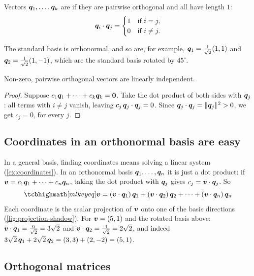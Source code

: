 \begin{definition}\label{def:orthonormal}
Vectors $\bm{q}_1, \dots, \bm{q}_k$ are  if they are pairwise
orthogonal and all have length $1$:
\[
  \bm{q}_i\cdot\bm{q}_j = \begin{cases} 1 & \text{if } i = j,\\
  0 & \text{if } i \neq j. \end{cases}
\]
\end{definition}

The standard basis is orthonormal, and so are, for example,
$\bm{q}_1 = \frac{1}{\sqrt2}(1, 1)$ and $\bm{q}_2 = \frac{1}{\sqrt2}(1, -1)$, which
are the standard basis rotated by $45^\circ$.

\begin{proposition}\label{prop:orth-indep}
Non-zero, pairwise orthogonal vectors are linearly independent.
\end{proposition}

\begin{proof}
Suppose $c_1\bm{q}_1 + \dots + c_k\bm{q}_k = \bm{0}$. Take the dot product of both
sides with $\bm{q}_j$: all terms with $i\neq j$ vanish, leaving
$c_j\,\bm{q}_j\cdot\bm{q}_j = 0$. Since $\bm{q}_j\cdot\bm{q}_j = \lVert\bm{q}_j\rVert^2 > 0$, we get
$c_j = 0$, for every $j$.
\end{proof}

\subsection{Coordinates in an orthonormal basis are easy}

In a general basis, finding coordinates means solving a linear system
(\cref{ex:coordinates}). In an orthonormal basis $\bm{q}_1, \dots, \bm{q}_n$ it is
just a dot product: if $\bm{v} = c_1\bm{q}_1 + \dots + c_n\bm{q}_n$, taking the dot
product with $\bm{q}_j$ gives $c_j = \bm{v}\cdot\bm{q}_j$. So
\[
  \keyeq{\vv = (\vv\cdot\vq_1)\,\vq_1 + (\vv\cdot\vq_2)\,\vq_2 + \dots
  + (\vv\cdot\vq_n)\,\vq_n}
\]
Each coordinate is the scalar projection of $\bm{v}$ onto one of the basis
directions (\cref{fig:projection-shadow}). For $\bm{v} = (5, 1)$ and the rotated
basis above: $\bm{v}\cdot\bm{q}_1 = \frac{6}{\sqrt2} = 3\sqrt2$ and
$\bm{v}\cdot\bm{q}_2 = \frac{4}{\sqrt2} = 2\sqrt2$, and indeed
$3\sqrt2\,\bm{q}_1 + 2\sqrt2\,\bm{q}_2 = (3, 3) + (2, -2) = (5, 1)$.

\subsection{Orthogonal matrices}

